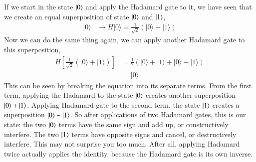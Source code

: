 If we start in the state $\left| 0 \right\rangle$ and apply the Hadamard gate to it, we have seen that we create an equal superposition of state $\left| 0 \right\rangle$ and $\left| 1 \right\rangle$,
\begin{equation}
\begin{aligned}
|0\rangle & \longrightarrow H|0\rangle=\frac{1}{\sqrt{2}}(|0\rangle+|1\rangle)
\end{aligned}
\end{equation}
Now we can do the same thing again, we can apply another Hadamard gate to this superposition,
\begin{equation}
\begin{aligned}
H\left[\frac{1}{\sqrt{2}}(|0\rangle+|1\rangle)\right] &=\frac{1}{2}(|0\rangle+|1\rangle+|0\rangle-|1\rangle) \\
&=|0\rangle
\end{aligned}
\end{equation}
This can be seen by breaking the equation into its separate terms. From the first term, applying the Hadamard to the state $\left| 0 \right\rangle$ creates another superposition $\left| 0 \right\rangle+\left| 1 \right\rangle$. Applying Hadamard gate to the second term, the state $\left| 1 \right\rangle$ creates a superposition $\left| 0 \right\rangle-\left| 1 \right\rangle$. So after applications of two Hadamard gates, this is our state: the two $\left| 0 \right\rangle$ terms have the same sign and add up, or constructively interfere. The two $\left| 1 \right\rangle$ terms have opposite signs and cancel, or destructively interfere.
This may not surprise you too much. After all, applying Hadamard twice actually applies the identity, because the Hadamard gate is its own inverse.

